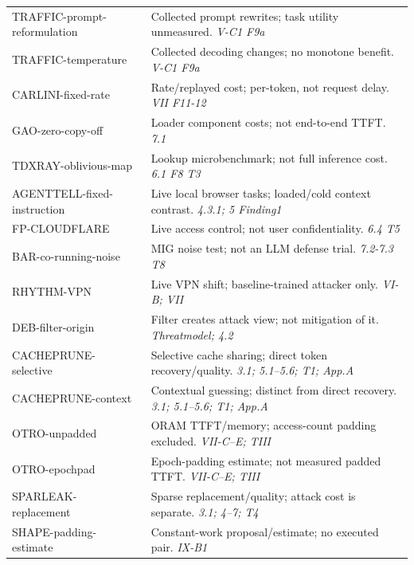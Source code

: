 \begin{table}[!t]
\begin{minipage}[t]{.492\textwidth}
\begin{tabularx}{\linewidth}{@{}p{.40\linewidth}X@{}}
TRAFFIC-\allowbreak{}prompt-\allowbreak{}reformulation~\cite{pouryousef2026traffic} & Collected prompt rewrites; task utility unmeasured. \emph{V-C1 F9a}\\
TRAFFIC-\allowbreak{}temperature~\cite{pouryousef2026traffic} & Collected decoding changes; no monotone benefit. \emph{V-C1 F9a}\\
CARLINI-\allowbreak{}fixed-\allowbreak{}rate~\cite{carlini2024remote} & Rate/replayed cost; per-token, not request delay. \emph{VII F11-12}\\
GAO-\allowbreak{}zero-\allowbreak{}copy-\allowbreak{}off~\cite{gao2025iknow} & Loader component costs; not end-to-end TTFT. \emph{7.1}\\
TDXRAY-\allowbreak{}oblivious-\allowbreak{}map~\cite{hornetz2026tdxray} & Lookup microbenchmark; not full inference cost. \emph{6.1 F8 T3}\\
AGENTTELL-\allowbreak{}fixed-\allowbreak{}instruction~\cite{shahriar2026agenttell} & Live local browser tasks; loaded/cold context contrast. \emph{4.3.1; 5 Finding1}\\
FP-\allowbreak{}CLOUDFLARE~\cite{wang2026fpagent} & Live access control; not user confidentiality. \emph{6.4 T5}\\
BAR-\allowbreak{}co-\allowbreak{}running-\allowbreak{}noise~\cite{gu2026behindbars} & MIG noise test; not an LLM defense trial. \emph{7.2-7.3 T8}\\
RHYTHM-\allowbreak{}VPN~\cite{alhazbi2025rhythm} & Live VPN shift; baseline-trained attacker only. \emph{VI-B; VII}\\
DEB-\allowbreak{}filter-\allowbreak{}origin~\cite{debenedetti2024privacy} & Filter creates attack view; not mitigation of it. \emph{Threatmodel; 4.2}\\
CACHEPRUNE-\allowbreak{}selective~\cite{wu2026cacheprune} & Selective cache sharing; direct token recovery/quality. \emph{3.1; 5.1--5.6; T1; App.A}\\
CACHEPRUNE-\allowbreak{}context~\cite{wu2026cacheprune} & Contextual guessing; distinct from direct recovery. \emph{3.1; 5.1--5.6; T1; App.A}\\
OTRO-\allowbreak{}unpadded~\cite{lee2026otro} & ORAM TTFT/memory; access-count padding excluded. \emph{VII-C--E; TIII}\\
OTRO-\allowbreak{}epochpad~\cite{lee2026otro} & Epoch-padding estimate; not measured padded TTFT. \emph{VII-C--E; TIII}\\
SPARLEAK-\allowbreak{}replacement~\cite{chen2026sparleak} & Sparse replacement/quality; attack cost is separate. \emph{3.1; 4--7; T4}\\
SHAPE-\allowbreak{}padding-\allowbreak{}estimate~\cite{hadad2026shape} & Constant-work proposal/estimate; no executed pair. \emph{IX-B1}\\
\bottomrule\end{tabularx}\end{minipage}
\end{table}

